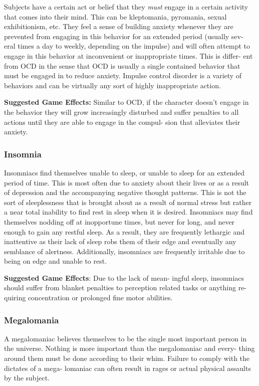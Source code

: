 Subjects have a certain act or belief that they \textit{must }
engage in a certain activity that comes into their 
mind. This can be kleptomania, pyromania, sexual 
exhibitionism, etc. They feel a sense of building 
anxiety whenever they are prevented from engaging 
in this behavior for an extended period (usually sev-
eral times a day to weekly, depending on the impulse) 
and will often attempt to engage in this behavior at 
inconvenient or inappropriate times. This is differ-
ent from OCD in the sense that OCD is usually a 
single contained behavior that must be engaged in to 
reduce anxiety. Impulse control disorder is a variety 
of behaviors and can be virtually any sort of highly 
inappropriate action.

\textbf{Suggested Game Effects: }Similar to OCD, if the 
character doesn't engage in the behavior they will 
grow increasingly disturbed and suffer penalties to all 
actions until they are able to engage in the compul-
sion that alleviates their anxiety.

\subsubsection{Insomnia}

Insomniacs find themselves unable to sleep, or unable 
to sleep for an extended period of time. This is most 
often due to anxiety about their lives or as a result 
of depression and the accompanying negative thought 
patterns. This is not the sort of sleeplessness that is 
brought about as a result of normal stress but rather 
a near total inability to find rest in sleep when it is 
desired. Insomniacs may find themselves nodding off 
at inopportune times, but never for long, and never 
enough to gain any restful sleep. As a result, they 
are frequently lethargic and inattentive as their lack 
of sleep robs them of their edge and eventually any 
semblance of alertness. Additionally, insomniacs are 
frequently irritable due to being on edge and unable 
to rest.

\textbf{Suggested Game Effects}: Due to the lack of mean-
ingful sleep, insomniacs should suffer from blanket 
penalties to perception related tasks or anything re-
quiring concentration or prolonged fine motor abilities.

\subsubsection{Megalomania}

A megalomaniac believes themselves to be the single 
most important person in the universe. Nothing is 
more important than the megalomaniac and every-
thing around them must be done according to their 
whim. Failure to comply with the dictates of a mega-
lomaniac can often result in rages or actual physical 
assaults by the subject.

